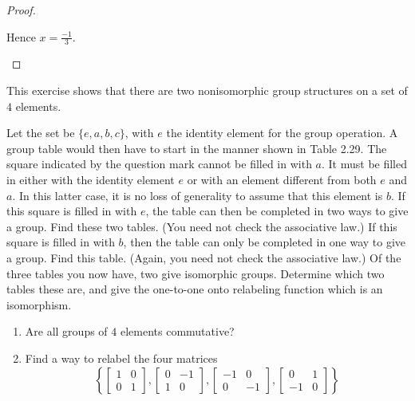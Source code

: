 \begin{proof}
\begin{enumerate}[label={\textbf{\alph*.}}]
              Hence $x = \frac{-1}{3}$.
    \end{enumerate}
\end{proof}

\newpage
\begin{exercise}
    This exercise shows that there are two nonisomorphic group structures on a set of $4$ elements.

    Let the set be $\{ e, a, b, c \}$, with $e$ the identity element for the group operation. A group table would then have to start in the manner shown in Table 2.29. The square indicated by the question mark cannot be filled in with $a$. It must be filled in either with the identity element $e$ or with an element different from both $e$ and $a$. In this latter case, it is no loss of generality to assume that this element is $b$. If this square is filled in with $e$, the table can then be completed in two ways to give a group. Find these two tables. (You need not check the associative law.) If this square is filled in with $b$, then the table can only be completed in one way to give a group. Find this table. (Again, you need not check the associative law.) Of the three tables you now have, two give isomorphic groups. Determine which two tables these are, and give the one-to-one onto relabeling function which is an isomorphism.

    \begin{enumerate}[label={\textbf{\alph*}}]
        \item Are all groups of $4$ elements commutative?
        \item Find a way to relabel the four matrices
              \[
                  \left\{\begin{bmatrix}
                      1 & 0 \\
                      0 & 1
                  \end{bmatrix},
                  \begin{bmatrix}
                      0 & -1 \\
                      1 & 0
                  \end{bmatrix},
                  \begin{bmatrix}
                      -1 & 0  \\
                      0  & -1
                  \end{bmatrix},
                  \begin{bmatrix}
                      0  & 1 \\
                      -1 & 0
                  \end{bmatrix}\right\}
              \]


\end{enumerate}
\end{exercise}

